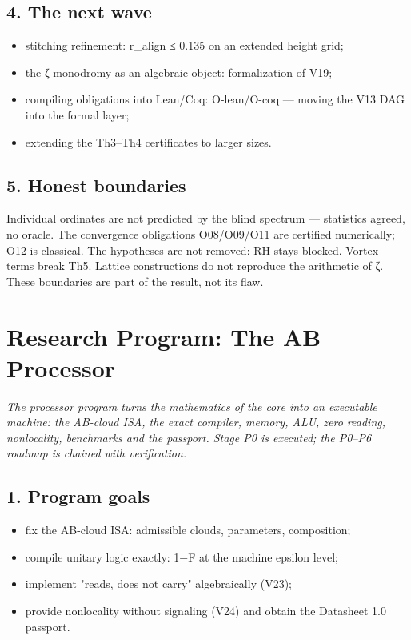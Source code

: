\documentclass[11pt,a4paper]{article}
\begin{document}
\subsection{4. The next wave}

\begin{itemize}
  \item stitching refinement: r\_align ≤ 0.135 on an extended height grid;
  \item the ζ monodromy as an algebraic object: formalization of V19;
  \item compiling obligations into Lean/Coq: O-lean/O-coq — moving the V13 DAG into the formal layer;
  \item extending the Th3–Th4 certificates to larger sizes.
\end{itemize}

\subsection{5. Honest boundaries}

Individual ordinates are not predicted by the blind spectrum — statistics agreed, no oracle. The convergence obligations O08/O09/O11 are certified numerically; O12 is classical. The hypotheses are not removed: RH stays blocked. Vortex terms break Th5. Lattice constructions do not reproduce the arithmetic of ζ. These boundaries are part of the result, not its flaw.

\section{Research Program: The AB Processor}

\noindent\textit{\color{copper}The processor program turns the mathematics of the core into an executable machine: the AB-cloud ISA, the exact compiler, memory, ALU, zero reading, nonlocality, benchmarks and the passport. Stage P0 is executed; the P0–P6 roadmap is chained with verification.}

\subsection{1. Program goals}

\begin{itemize}
  \item fix the AB-cloud ISA: admissible clouds, parameters, composition;
  \item compile unitary logic exactly: 1−F at the machine epsilon level;
  \item implement "reads, does not carry" algebraically (V23);
  \item provide nonlocality without signaling (V24) and obtain the Datasheet 1.0 passport.
\end{itemize}
\end{document}
